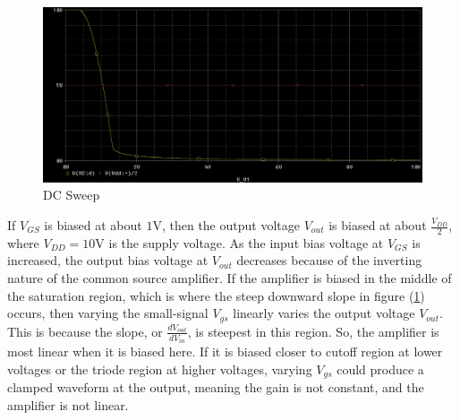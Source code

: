 \FloatBarrier

\begin{figure}[h!]
	\centering
	\includegraphics[scale=0.75]{../images/vout_vs_v3.PNG}
	\caption{DC Sweep}
	\label{fig:vout_vs_v3}
\end{figure}

\FloatBarrier

If $V_{GS}$ is biased at about $1$\si{\volt}, then the output voltage $V_{out}$ is biased at about $\frac{V_{DD}}{2}$, where $V_{DD} = 10$\si{\volt} is the supply voltage. As the input bias voltage at $V_{GS}$ is increased, the output bias voltage at $V_{out}$ decreases because of the inverting nature of the common source amplifier. If the amplifier is biased in the middle of the saturation region, which is where the steep downward slope in figure (\ref{fig:vout_vs_v3}) occurs, then varying the small-signal $V_{gs}$ linearly varies the output voltage $V_{out}$. This is because the slope, or $\frac{dV_{out}}{dV_{in}}$, is steepest in this region. So, the amplifier is most linear when it is biased here. If it is biased closer to cutoff region at lower voltages or the triode region at higher voltages, varying $V_{gs}$ could produce a clamped waveform at the output, meaning the gain is not constant, and the amplifier is not linear. \\
